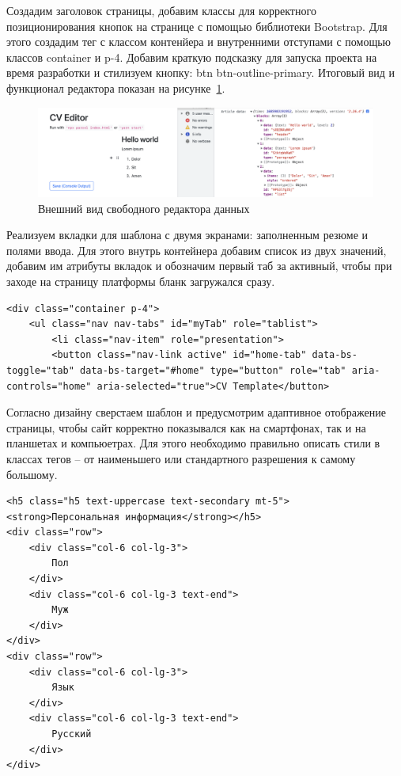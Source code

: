 \documentclass[master, och, coursework]{SCWorks}
\begin{document}
Создадим заголовок страницы, добавим классы для корректного позиционирования 
кнопок на странице с помощью библиотеки Bootstrap. Для этого создадим тег с классом
контенйера и внутренними отступами с помощью классов container и p-4. Добавим краткую
подсказку для запуска проекта на время разработки и стилизуем кнопку: btn 
btn-outline-primary. Итоговый вид и функционал редактора показан на рисунке~\ref{fig:22}.
\begin{figure}[!ht]
    \centering
    \includegraphics[width=12cm]{images/image22.png}
    \caption{\label{fig:22}%
        Внешний вид свободного редактора данных}
\end{figure}


Реализуем вкладки для шаблона с двумя экранами: заполненным резюме и полями ввода. Для
этого внутрь контейнера добавим список из двух значений, добавим им атрибуты вкладок и 
обозначим первый таб за активный, чтобы при заходе на страницу платформы бланк
загружался сразу.
\begin{verbatim}
<div class="container p-4">
    <ul class="nav nav-tabs" id="myTab" role="tablist">
        <li class="nav-item" role="presentation">
        <button class="nav-link active" id="home-tab" data-bs-toggle="tab" data-bs-target="#home" type="button" role="tab" aria-controls="home" aria-selected="true">CV Template</button>
\end{verbatim}

Согласно дизайну сверстаем шаблон и предусмотрим адаптивное отображение страницы, 
чтобы сайт корректно показывался как на смартфонах, так и на планшетах и компьюетрах.
Для этого необходимо правильно описать стили в классах тегов – от наименьшего или
стандартного разрешения к самому большому. 
\begin{verbatim}
<h5 class="h5 text-uppercase text-secondary mt-5">
<strong>Персональная информация</strong></h5>
<div class="row">
    <div class="col-6 col-lg-3">
        Пол
    </div>
    <div class="col-6 col-lg-3 text-end">
        Муж
    </div>
</div>
<div class="row">
    <div class="col-6 col-lg-3">
        Язык
    </div>
    <div class="col-6 col-lg-3 text-end">
        Русский
    </div>
</div>
\end{verbatim}
\end{document}
